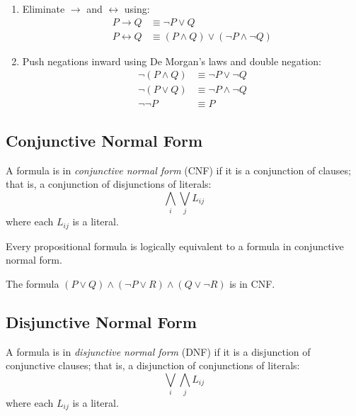\begin{remark}
\begin{enumerate}
  \item Eliminate $\rightarrow$ and $\leftrightarrow$ using:
  \begin{align*}
    P \rightarrow Q &\equiv \neg P \vee Q \\
    P \leftrightarrow Q &\equiv (P \wedge Q) \vee (\neg P \wedge \neg Q)
  \end{align*}
  \item Push negations inward using De Morgan's laws and double negation:
  \begin{align*}
    \neg(P \wedge Q) &\equiv \neg P \vee \neg Q \\
    \neg(P \vee Q) &\equiv \neg P \wedge \neg Q \\
    \neg\neg P &\equiv P
  \end{align*}
\end{enumerate}
\end{remark}

\subsection{Conjunctive Normal Form}

\begin{definition}
A formula is in \emph{conjunctive normal form} (CNF) if it is a conjunction of
clauses; that is, a conjunction of disjunctions of literals:
\[
\bigwedge_{i} \bigvee_{j} L_{ij}
\]
where each $L_{ij}$ is a literal.
\end{definition}

\begin{theorem}
Every propositional formula is logically equivalent to a formula in conjunctive
normal form.
\end{theorem}

\begin{example}
The formula $(P \vee Q) \wedge (\neg P \vee R) \wedge (Q \vee \neg R)$ is in CNF.
\end{example}

\subsection{Disjunctive Normal Form}

\begin{definition}
A formula is in \emph{disjunctive normal form} (DNF) if it is a disjunction of
conjunctive clauses; that is, a disjunction of conjunctions of literals:
\[
\bigvee_{i} \bigwedge_{j} L_{ij}
\]
where each $L_{ij}$ is a literal.
\end{definition}

